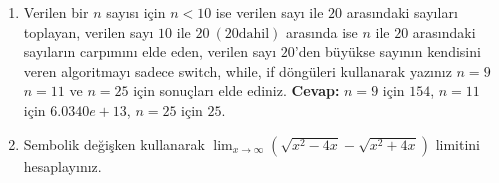\documentclass{assignment}
\begin{document}
\begin{enumerate}
 \(z=g(x)= \begin{cases} 2-x, & u \leq 2 \\ 2x-3, & x>2 \\\end{cases} \)
şeklinde tanımlıdır. 
Bu  durumda \(fog(x)\) fonksiyonunun sonucunu hesaplayan algoritmayı yazınız ve \((fog)(0) \) değerini hesaplayınız. 
 \newline 
 \newline 
\textbf{Cevap:} \(7\)
\item Verilen bir \(n\) sayısı için  \(n<10\) ise verilen sayı ile \(20\) arasındaki
sayıları toplayan, verilen sayı \(10\) ile \(20 \: (20 \mbox{dahil})\) arasında ise \(n\) ile \(20\)
arasındaki sayıların carpımını elde eden, verilen sayı \(20\)'den büyükse
sayının kendisini veren algoritmayı sadece switch, while, if  döngüleri  kullanarak
yazınız \(n=9\) \(n=11\) ve \(n=25\) için sonuçları elde ediniz. 
\newline 
 \newline 
\textbf{Cevap:} \(n=9\) için \(154\), \(n=11\) için  \(6.0340e+13\), \(n=25\) için \(25\).

\item Sembolik değişken kullanarak \(\lim_{x \rightarrow \infty} (\sqrt{x^2-4x}-\sqrt{x^2+4x})\)
 limitini hesaplayınız. 






\end{enumerate}
\end{document}
